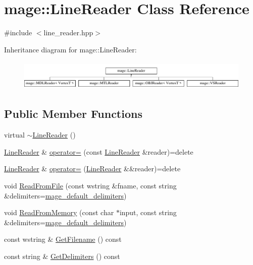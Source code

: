 \hypertarget{classmage_1_1_line_reader}{}\section{mage\+:\+:Line\+Reader Class Reference}
\label{classmage_1_1_line_reader}


{\ttfamily \#include $<$line\+\_\+reader.\+hpp$>$}

Inheritance diagram for mage\+:\+:Line\+Reader\+:\begin{figure}[H]
\begin{center}
\leavevmode
\includegraphics[height=1.458333cm]{classmage_1_1_line_reader}
\end{center}
\end{figure}
\subsection*{Public Member Functions}
\begin{DoxyCompactItemize}
\item 
virtual \hyperlink{classmage_1_1_line_reader_ad9753ea392ebe5b3867852d3392fb1e7}{$\sim$\+Line\+Reader} ()
\item 
\hyperlink{classmage_1_1_line_reader}{Line\+Reader} \& \hyperlink{classmage_1_1_line_reader_a2247078d0b5602f9a9a6b74019832faf}{operator=} (const \hyperlink{classmage_1_1_line_reader}{Line\+Reader} \&reader)=delete
\item 
\hyperlink{classmage_1_1_line_reader}{Line\+Reader} \& \hyperlink{classmage_1_1_line_reader_a45504c0ba4238eedf851cfb9df081a01}{operator=} (\hyperlink{classmage_1_1_line_reader}{Line\+Reader} \&\&reader)=delete
\item 
void \hyperlink{classmage_1_1_line_reader_a2df875468f06ec58c7aa1ff96157aeb0}{Read\+From\+File} (const wstring \&fname, const string \&delimiters=\hyperlink{namespacemage_ae247ad66af37a4b0d67ddca9404ca01a}{mage\+\_\+default\+\_\+delimiters})
\item 
void \hyperlink{classmage_1_1_line_reader_a1c21aba81c3873c7ed299ca978c4db74}{Read\+From\+Memory} (const char $\ast$input, const string \&delimiters=\hyperlink{namespacemage_ae247ad66af37a4b0d67ddca9404ca01a}{mage\+\_\+default\+\_\+delimiters})
\item 
const wstring \& \hyperlink{classmage_1_1_line_reader_a64a800d9fe9c242b9b14d034a7d604eb}{Get\+Filename} () const
\item 
const string \& \hyperlink{classmage_1_1_line_reader_a7de405beff27d5cc55bb93e1b1e9727a}{Get\+Delimiters} () const
\end{DoxyCompactItemize}
